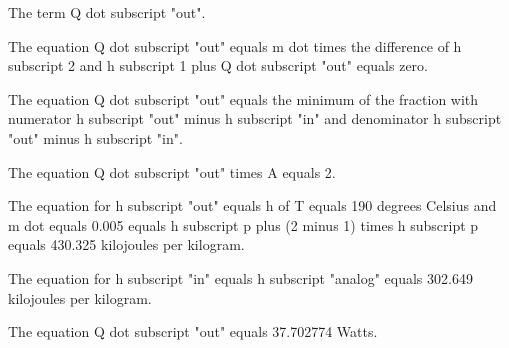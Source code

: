 The term Q dot subscript "out".

The equation Q dot subscript "out" equals m dot times the difference of h subscript 2 and h subscript 1 plus Q dot subscript "out" equals zero.

The equation Q dot subscript "out" equals the minimum of the fraction with numerator h subscript "out" minus h subscript "in" and denominator h subscript "out" minus h subscript "in".

The equation Q dot subscript "out" times A equals 2.

The equation for h subscript "out" equals h of T equals 190 degrees Celsius and m dot equals 0.005 equals h subscript p plus (2 minus 1) times h subscript p equals 430.325 kilojoules per kilogram.

The equation for h subscript "in" equals h subscript "analog" equals 302.649 kilojoules per kilogram.

The equation Q dot subscript "out" equals 37.702774 Watts.